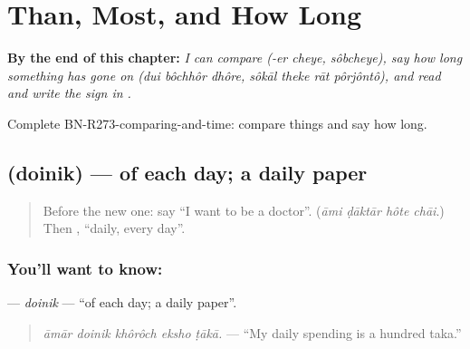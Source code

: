 
\chapter{Than, Most, and How Long}
\label{ch:bn-than-most-and-how-long}

\begin{chapteropening}
\textbf{By the end of this chapter:} \emph{I can compare (-er cheye, sôbcheye), say how long something has gone on (dui bôchhôr dhôre, sôkāl theke rāt pôrjôntô), and read and write the sign  in .}

Complete BN-R273-comparing-and-time: compare things and say how long.
\end{chapteropening}

\section[\texorpdfstring{\bn{দৈনিক} (doinik)}{দৈনিক (doinik)}]{ (doinik) — of each day; a daily paper}

\label{lesson:BN-C273-doinik}



\begin{quote}
Before the new one: say \textquotedblleft{}I want to be a doctor\textquotedblright{}. (\emph{āmi ḍāktār hôte chāi}.) Then \textbf{}, \textquotedblleft{}daily, every day\textquotedblright{}.
\end{quote}

\subsection*{You'll want to know: }
\textbf{} — \emph{doinik} — \textquotedblleft{}of each day; a daily paper\textquotedblright{}.

\begin{quote}
\textbf{    }
\end{quote}

\begin{quote}
\emph{āmār doinik khôrôch eksho ṭākā.} — \textquotedblleft{}My daily spending is a hundred taka.\textquotedblright{}
\end{quote}

